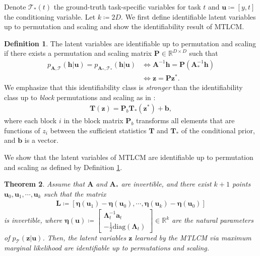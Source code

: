 \documentclass[nohyperref]{article}
\theoremstyle{plain}
\newtheorem{theorem}{Theorem}[section]
\theoremstyle{definition}
\newtheorem{definition}[theorem]{Definition}
\theoremstyle{remark}
\begin{document}
Denote $\mathcal{T}_{*}(t)$ the ground-truth task-specific variables for task $t$ and $\mathbf{u}\coloneqq[y,t]$ the conditioning variable. Let $k\coloneqq2D$. We first define identifiable latent variables up to permutation and scaling and show the identifiability result of MTLCM.
\begin{definition}\label{def:strong-id}
    The latent variables are identifiable up to permutation and scaling if there exists a permutation and scaling matrix $\mathbf{P}\in\mathbb{R}^{D\times D}$ 
    such that 
    \begin{equation}
        \begin{split}
            p_{\mathbf{A},\mathcal{T}}(\mathbf{h}|\mathbf{u})=p_{\mathbf{A}_{*},\mathcal{T}_{*}}(\mathbf{h}|\mathbf{u})
            &\iff\mathbf{A}^{-1}\mathbf{h}=\mathbf{P}(\mathbf{A}_*^{-1}\mathbf{h})\\
            &\iff\mathbf{z}=\mathbf{P}\mathbf{z}^*.
        \end{split}
    \end{equation}
    We emphasize that this identifiability class is \textit{stronger} than the identifiability class up to \textit{block} permutations and scaling as in \citet{Khemakhem_Kingma_Monti_Hyvarinen_2020,Lu_Wu_Hernandez-Lobato_Scholkopf_2022}:
    \begin{align}
        \mathbf{T}(\mathbf{z})=\mathbf{P}_b\mathbf{T}_*(\mathbf{z}^*)+\mathbf{b},
    \end{align}
    where each block $i$ in the block matrix $\mathbf{P}_b$ transforms all elements that are functions of $z_i$ between the sufficient statistics $\mathbf{T}$ and $\mathbf{T}_*$ of the conditional prior, and $\mathbf{b}$ is a vector.
\end{definition}
We show that the latent variables of MTLCM are identifiable up to permutation and scaling as defined by Definition \ref{def:strong-id}.
\begin{theorem}\label{thm:lin-causal-id}
    Assume that $\mathbf{A}$ and $\mathbf{A}_{*}$ are invertible, and there exist $k+1$ points $\mathbf{u}_0, \mathbf{u}_1,\cdots,\mathbf{u}_{k}$ such that the matrix
    \begin{align}
        \mathbf{L}\coloneqq[\boldsymbol{\eta}(\mathbf{u}_1)-\boldsymbol{\eta}(\mathbf{u}_0),\cdots,\boldsymbol{\eta}(\mathbf{u}_{k})-\boldsymbol{\eta}(\mathbf{u}_0)]
    \end{align}
    is invertible, where $\boldsymbol{\eta}(\mathbf{u})\coloneqq\left[\begin{smallmatrix}\boldsymbol{\Lambda}_t^{-1}\mathbf{a}_t \\ -\frac{1}{2}\text{diag}(\boldsymbol{\Lambda}_t)\end{smallmatrix}\right]\in\mathbb{R}^{k}$ are the natural parameters of $p_{\mathcal{T}}(\mathbf{z}|\mathbf{u})$. Then, the latent variables $\mathbf{z}$ learned by the MTLCM via maximum marginal likelihood are identifiable up to permutations and scaling.
\end{theorem}
\end{document}
